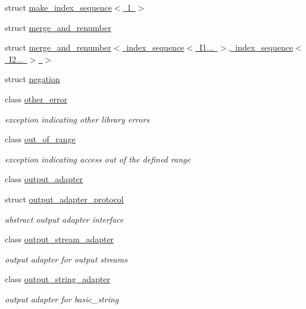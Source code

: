 \begin{DoxyCompactItemize}
struct \mbox{\hyperlink{structnlohmann_1_1detail_1_1make__index__sequence_3_011_01_4}{make\+\_\+index\+\_\+sequence$<$ 1 $>$}}
\item 
struct \mbox{\hyperlink{structnlohmann_1_1detail_1_1merge__and__renumber}{merge\+\_\+and\+\_\+renumber}}
\item 
struct \mbox{\hyperlink{structnlohmann_1_1detail_1_1merge__and__renumber_3_01index__sequence_3_01_i1_8_8_8_01_4_00_01indf5ec8c9c7b5107e4b381e3ca4c1be2ca}{merge\+\_\+and\+\_\+renumber$<$ index\+\_\+sequence$<$ I1... $>$, index\+\_\+sequence$<$ I2... $>$ $>$}}
\item 
struct \mbox{\hyperlink{structnlohmann_1_1detail_1_1negation}{negation}}
\item 
class \mbox{\hyperlink{classnlohmann_1_1detail_1_1other__error}{other\+\_\+error}}
\begin{DoxyCompactList}\small\item\em exception indicating other library errors \end{DoxyCompactList}\item 
class \mbox{\hyperlink{classnlohmann_1_1detail_1_1out__of__range}{out\+\_\+of\+\_\+range}}
\begin{DoxyCompactList}\small\item\em exception indicating access out of the defined range \end{DoxyCompactList}\item 
class \mbox{\hyperlink{classnlohmann_1_1detail_1_1output__adapter}{output\+\_\+adapter}}
\item 
struct \mbox{\hyperlink{structnlohmann_1_1detail_1_1output__adapter__protocol}{output\+\_\+adapter\+\_\+protocol}}
\begin{DoxyCompactList}\small\item\em abstract output adapter interface \end{DoxyCompactList}\item 
class \mbox{\hyperlink{classnlohmann_1_1detail_1_1output__stream__adapter}{output\+\_\+stream\+\_\+adapter}}
\begin{DoxyCompactList}\small\item\em output adapter for output streams \end{DoxyCompactList}\item 
class \mbox{\hyperlink{classnlohmann_1_1detail_1_1output__string__adapter}{output\+\_\+string\+\_\+adapter}}
\begin{DoxyCompactList}\small\item\em output adapter for basic\+\_\+string \end{DoxyCompactList}\item 

\end{DoxyCompactItemize}
